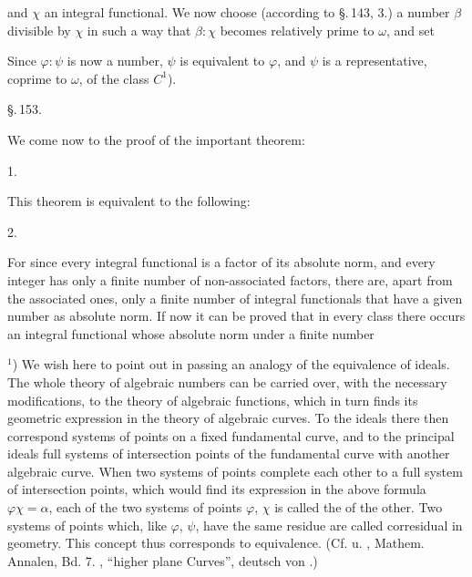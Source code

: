 and $\chi$ an integral functional. We now choose (according to \S.\,143, 3.) a number $\beta$ divisible by $\chi$ in such a way that $\beta:\chi$ becomes relatively prime to $\omega$, and set


Since $\varphi:\psi$ is now a number, $\psi$ is equivalent to $\varphi$, and $\psi$ is a representative, coprime to $\omega$, of the class $C^1$).

\S.\,153.


We come now to the proof of the important theorem:

1. 

This theorem is equivalent to the following:

2. 

For since every integral functional is a factor of its absolute norm, and every integer has only a finite number of non-associated factors, there are, apart from the associated ones, only a finite number of integral functionals that have a given number as absolute norm. If now it can be proved that in every class there occurs an integral functional whose absolute norm under a finite number

\begin{footnotesize}
$^1$) We wish here to point out in passing an analogy of the equivalence of ideals. The whole theory of algebraic numbers can be carried over, with the necessary modifications, to the theory of algebraic functions, which in turn finds its geometric expression in the theory of algebraic curves. To the ideals there then correspond systems of points on a fixed fundamental curve, and to the principal ideals full systems of intersection points of the fundamental curve with another algebraic curve. When two systems of points complete each other to a full system of intersection points, which would find its expression in the above formula $\varphi\chi = \alpha$, each of the two systems of points $\varphi$, $\chi$ is called the  of the other. Two systems of points which, like $\varphi$, $\psi$, have the same residue are called corresidual in geometry. This concept thus corresponds to equivalence. (Cf.  u. , Mathem. Annalen, Bd. 7. , ``higher plane Curves'', deutsch von .)
\end{footnotesize}
